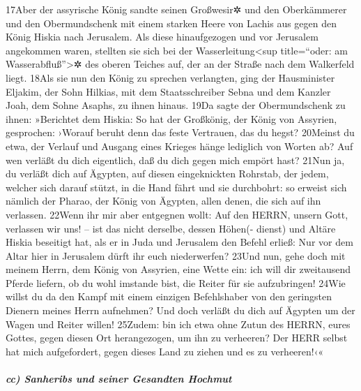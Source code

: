 17Aber der assyrische König sandte seinen Großwesir✲ und den
Oberkämmerer und den Obermundschenk mit einem starken Heere von Lachis
aus gegen den König Hiskia nach Jerusalem. Als diese hinaufgezogen und
vor Jerusalem angekommen waren, stellten sie sich bei der
Wasserleitung\textless sup title=``oder: am Wasserabfluß''\textgreater✲
des oberen Teiches auf, der an der Straße nach dem Walkerfeld liegt.
18Als sie nun den König zu sprechen verlangten, ging der Hausminister
Eljakim, der Sohn Hilkias, mit dem Staatsschreiber Sebna und dem Kanzler
Joah, dem Sohne Asaphs, zu ihnen hinaus. 19Da sagte der Obermundschenk
zu ihnen: »Berichtet dem Hiskia: So hat der Großkönig, der König von
Assyrien, gesprochen: ›Worauf beruht denn das feste Vertrauen, das du
hegst? 20Meinst du etwa, der Verlauf und Ausgang eines Krieges hänge
lediglich von Worten ab? Auf wen verläßt du dich eigentlich, daß du dich
gegen mich empört hast? 21Nun ja, du verläßt dich auf Ägypten, auf
diesen eingeknickten Rohrstab, der jedem, welcher sich darauf stützt, in
die Hand fährt und sie durchbohrt: so erweist sich nämlich der Pharao,
der König von Ägypten, allen denen, die sich auf ihn verlassen. 22Wenn
ihr mir aber entgegnen wollt: Auf den HERRN, unsern Gott, verlassen wir
uns! -- ist das nicht derselbe, dessen Höhen(- dienst) und Altäre Hiskia
beseitigt hat, als er in Juda und Jerusalem den Befehl erließ: Nur vor
dem Altar hier in Jerusalem dürft ihr euch niederwerfen? 23Und nun, gehe
doch mit meinem Herrn, dem König von Assyrien, eine Wette ein: ich will
dir zweitausend Pferde liefern, ob du wohl imstande bist, die Reiter für
sie aufzubringen! 24Wie willst du da den Kampf mit einem einzigen
Befehlshaber von den geringsten Dienern meines Herrn aufnehmen? Und doch
verläßt du dich auf Ägypten um der Wagen und Reiter willen! 25Zudem: bin
ich etwa ohne Zutun des HERRN, eures Gottes, gegen diesen Ort
herangezogen, um ihn zu verheeren? Der HERR selbst hat mich
aufgefordert, gegen dieses Land zu ziehen und es zu verheeren!‹«

\hypertarget{cc-sanheribs-und-seiner-gesandten-hochmut}{%
\subparagraph{cc) Sanheribs und seiner Gesandten
Hochmut}\label{cc-sanheribs-und-seiner-gesandten-hochmut}}

